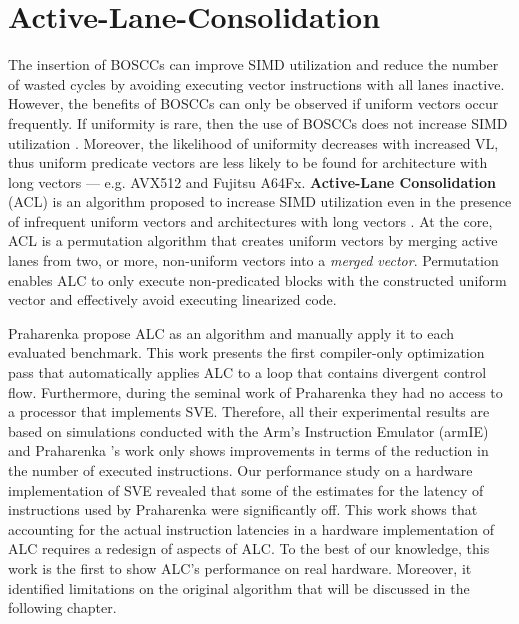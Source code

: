 \section{Active-Lane-Consolidation}

The insertion of BOSCCs can improve SIMD utilization and reduce the number of wasted cycles by avoiding executing vector instructions with all lanes inactive.
However, the benefits of BOSCCs can only be observed if uniform vectors occur frequently.
If uniformity is rare, then the use of BOSCCs does not increase SIMD utilization \cite{praharenka_vectorizing_2022}.
Moreover, the likelihood of uniformity decreases with increased VL, thus uniform predicate vectors are less likely to be found for architecture with long vectors --- e.g. AVX512 and Fujitsu A64Fx.
\textbf{Active-Lane Consolidation} (ACL) is an algorithm proposed to increase SIMD utilization even in the presence of infrequent uniform vectors and architectures with long vectors \cite{praharenka_vectorizing_2022}.
At the core, ACL is a permutation algorithm that creates uniform vectors by merging active lanes from two, or more, non-uniform vectors into a \emph{merged vector}.
Permutation enables ALC to only execute non-predicated blocks with the constructed uniform vector and effectively avoid executing linearized code.

Praharenka \etal propose ALC as an algorithm and manually apply it to each evaluated benchmark.
This work presents the first compiler-only optimization pass that automatically applies ALC to a loop that contains divergent control flow. 
Furthermore, during the seminal work of Praharenka \etal they had no access to a processor that implements SVE.
Therefore, all their experimental results are based on simulations conducted with the Arm's Instruction Emulator (\acrshort{armIE}) and Praharenka \etal's work only shows improvements in terms of the reduction in the number of executed instructions.
Our performance study on a hardware implementation of SVE revealed that some of the estimates for the latency of instructions used by Praharenka \etal were significantly off.
This work shows that accounting for the actual instruction latencies in a hardware implementation of ALC requires a redesign of aspects of ALC.
To the best of our knowledge, this work is the first to show ALC's performance on real hardware.
Moreover, it identified limitations on the original algorithm that will be discussed in the following chapter.

